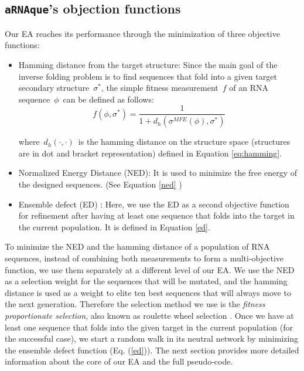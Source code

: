 
\subsection{\texttt{aRNAque}'s objection functions}
\label{sec:objective_function}
Our EA reaches its performance through the minimization of three objective functions:

\begin{itemize}
	\item
	Hamming distance from the target structure: Since the main goal of the inverse folding problem is to find sequences that fold into a given target secondary structure~\(\sigma^*\), the simple fitness measurement~\(f\) of an RNA sequence~\(\phi\)~can be defined as follows:
\begin{equation}
\label{eq:fitness}
f(\phi, \sigma^*) = \frac{1}{1 + d_h(\sigma^{MFE}(\phi) , \sigma^*)}
\end{equation}

where~\(d_h(\cdot,\cdot)\)~is the hamming distance on the structure space (structures are in dot and bracket representation) defined in Equation \ref{eq:hamming}.

	\item
	Normalized Energy Distance (NED): It is used to minimize the free energy of the designed sequences. (See Equation \ref{ned} )

	\item
	Ensemble defect (ED) \cite{zadeh2011nucleic}: Here, we use the ED as a second objective function for refinement after having at least one sequence that folds into the target in the current population. It is defined in Equation \ref{ed}.
\end{itemize}
To minimize the NED and the hamming distance of a population of RNA sequences, instead of combining both measurements to form a multi-objective function, we use them separately at a different level of our EA. We use the NED as a selection weight for the sequences that will be mutated, and the hamming distance is used as a weight to elite ten best sequences that will always move to the next generation. Therefore the selection method we use is the \textit{fitness proportionate selection}, also known as roulette wheel selection \cite{lipowski2012roulette}. Once we have at least one sequence that folds into the given target in the current population (for the successful case), we start a random walk in its neutral network by minimizing the ensemble defect function (Eq. (\ref{ed})). The next section provides more detailed information about the core of our EA and the full pseudo-code. 

